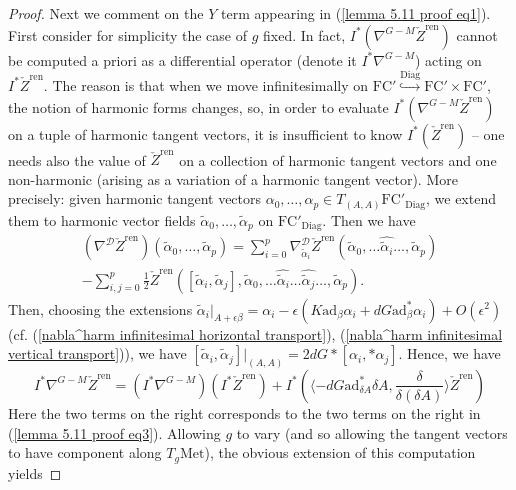 \documentclass[11pt,a4paper]{amsart}
\theoremstyle{plain} %
\theoremstyle{definition}
\theoremstyle{remark}
\newcommand{\mr}{\mathrm}
\newcommand{\wh}{\widehat}
\newcommand{\til}{\widetilde}
\newcommand{\mc}{\mathcal}
\newcommand{\ad}{\mathrm{ad}}
\newcommand{\FC}{\mathrm{FC}}
\begin{document}
\begin{proof}
    Next we comment on the $Y$ term appearing in (\ref{lemma 5.11 proof eq1}). First consider for simplicity the case of $g$ fixed. In fact, $I^* (\nabla^{G-M} \check{Z}^\mr{ren})$ cannot be computed a priori as a differential operator (denote it $I^*\nabla^{G-M}$) acting on $I^*\check{Z}^\mr{ren}$. The reason is that when we move infinitesimally on $\FC' \stackrel{\mr{Diag}}{\hookrightarrow}\FC'\times \FC'$, %
    the notion of harmonic forms changes, so, in order to evaluate $I^* (\nabla^{G-M} \check{Z}^\mr{ren})$ on a tuple of harmonic tangent vectors, it is insufficient to know $I^*(\check{Z}^\mr{ren})$ -- one needs also the value of $\check{Z}^\mr{ren}$ on a collection of harmonic tangent vectors and one non-harmonic (arising as a variation of a harmonic tangent vector). 
    More precisely: given harmonic tangent vectors $\alpha_0,\ldots,\alpha_p \in T_{(A,A)}\FC'_\mr{Diag}$, we extend them to harmonic vector fields $\til\alpha_0,\ldots,\til\alpha_p$ on $\FC'_\mr{Diag}$. Then we have
    \begin{multline}\label{lemma 5.11 proof eq3}
        (\nabla^\mc{D}\check{Z}^\mr{ren})(\til\alpha_0,\ldots,\til\alpha_p)=
        \sum_{i=0}^p %
        \nabla^\mc{D}_{\til\alpha_i}\check{Z}^\mr{ren}(\til\alpha_0,\ldots\wh{\til\alpha_i}\ldots, \til\alpha_p)\\
        -
        \sum_{i,j=0}^p \frac12 %
        \check{Z}^\mr{ren}([\til\alpha_i,\til\alpha_j],\til\alpha_0,\ldots\wh{\til\alpha_i}\ldots\wh{\til\alpha_j}\ldots,\til\alpha_p).
    \end{multline}
    Then, choosing the extensions $\til\alpha_i|_{A+\epsilon \beta}=\alpha_i-\epsilon (K \mr{ad}_\beta \alpha_i+dG \mr{ad}^*_{\beta}\alpha_i)+O(\epsilon^2)$ (cf. (\ref{nabla^harm infinitesimal horizontal transport}), (\ref{nabla^harm infinitesimal vertical transport})), we have 
    $[\til\alpha_i,\til\alpha_j]|_{(A,A)}=2dG*[\alpha_i,*\alpha_j]$. Hence, we have
    \begin{equation}
        I^* \nabla^{G-M} \check{Z}^\mr{ren}=(I^* \nabla^{G-M}) (I^* \check{Z}^\mr{ren})+I^*(\langle -d G \ad^*_{\delta A}\delta A,\frac{\delta}{\delta(\delta A)} \rangle \check{Z}^\mr{ren} )
    \end{equation}
    Here the two terms on the right corresponds to the two terms on the right in (\ref{lemma 5.11 proof eq3}).
    Allowing $g$ to vary (and so allowing the tangent vectors to have component along $T_g\mr{Met}$), the obvious extension of this computation yields 

\end{proof}
\end{document}

